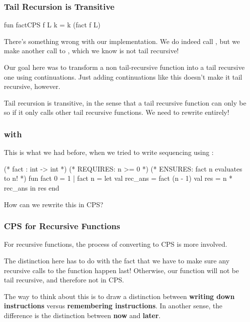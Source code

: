 \documentclass[aspectratio=169]{beamer}
\begin{document}
\begin{frame}[fragile]
  \frametitle{Tail Recursion is Transitive}

  \begin{codeblock}
    fun factCPS f L k = k (fact f L)
  \end{codeblock}


  There's something wrong with our implementation. We do indeed call 
  , but we make another call to , which we know is 
  not tail recursive!

  \vspace{\fill}

  Our goal here was to transform a non tail-recursive function into
  a tail recursive one using continuations. Just adding continuations
  like this doesn't make it tail recursive, however.

  \vspace{\fill}

  Tail recursion is transitive, in the sense that a tail recursive
  function can only be so if it only calls other tail recursive functions. 
  We need to rewrite  entirely!
\end{frame}

\begin{frame}[fragile]
  \frametitle{ with }

  This is what we had before, when we tried to write sequencing using :

  \vspace{\fill}

  \begin{codeblock}
    (* fact : int -> int *) 
    (* REQUIRES: n >= 0 *)
    (* ENSURES: fact n evaluates to n! *)
    fun fact 0 = 1
      | fact n = 
        let 
          val rec_ans = fact (n - 1) 
          val res = n * rec_ans
        in
          res
        end
  \end{codeblock}

  How can we rewrite this in CPS?
\end{frame}

\begin{frame}[fragile]
  \frametitle{CPS for Recursive Functions}

  For recursive functions, the process of converting to CPS is more involved.

  The distinction here has to do with the fact that we have to make sure any
  recursive calls to the function happen last! Otherwise, our function will
  not be tail recursive, and therefore not in CPS.

  The way to think about this is to draw a distinction between
  \textbf{writing down instructions} versus \textbf{remembering instructions}.
  In another sense, the difference is the distinction between \textbf{now}
  and \textbf{later}. 
\end{frame}
\end{document}
